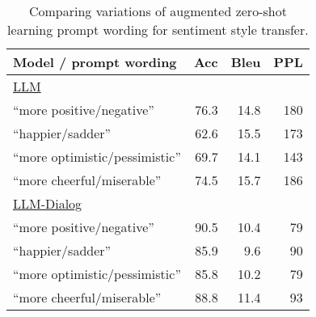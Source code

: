 \begin{table}[ht]
    \centering \small 
    \begin{tabular}{lrrr}
    \toprule
    Model / prompt wording &Acc&Bleu&PPL \\
    \midrule
    \underline{LLM}&&&\\
    ``more {positive/negative}''&76.3&14.8&180\\
    ``{happier/sadder}''&62.6&15.5&173\\
    ``more {optimistic/pessimistic}''&69.7&14.1&143\\
    ``more {cheerful/miserable}''&74.5&15.7&186\\
    \midrule
    \underline{LLM-Dialog}&&&\\
    ``more {positive/negative}''&90.5&10.4&79 \\
    ``{happier/sadder}''&85.9&9.6&90 \\
    ``more {optimistic/pessimistic}''&85.8&10.2&79 \\
    ``more {cheerful/miserable}''&88.8&11.4&93 \\
    \bottomrule
    \end{tabular}
\caption{Comparing variations of augmented zero-shot learning prompt wording for sentiment style transfer.}
\label{tab:compare-between-prompts}
\end{table}